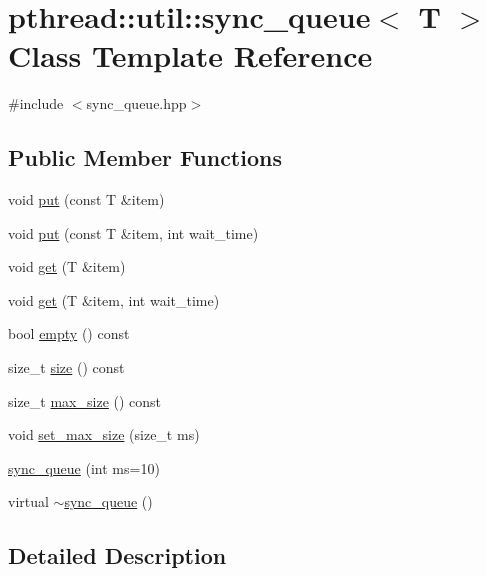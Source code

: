\hypertarget{classpthread_1_1util_1_1sync__queue}{\section{pthread\+:\+:util\+:\+:sync\+\_\+queue$<$ T $>$ Class Template Reference}
\label{classpthread_1_1util_1_1sync__queue}
}


{\ttfamily \#include $<$sync\+\_\+queue.\+hpp$>$}

\subsection*{Public Member Functions}
\begin{DoxyCompactItemize}
\item 
void \hyperlink{classpthread_1_1util_1_1sync__queue_a235265f27a6d2500ab2b56c83d703f06}{put} (const T \&item)
\item 
void \hyperlink{classpthread_1_1util_1_1sync__queue_aa507ddc9d8d86fa8d9510c3bc63a877b}{put} (const T \&item, int wait\+\_\+time)
\item 
void \hyperlink{classpthread_1_1util_1_1sync__queue_ac30ef4e626177ae47f27399ff3c8f28b}{get} (T \&item)
\item 
void \hyperlink{classpthread_1_1util_1_1sync__queue_ae5354915a1c76760924855318a11be04}{get} (T \&item, int wait\+\_\+time)
\item 
bool \hyperlink{classpthread_1_1util_1_1sync__queue_ad915d5b45a49f6f6bd09b5bdf170dd10}{empty} () const 
\item 
size\+\_\+t \hyperlink{classpthread_1_1util_1_1sync__queue_a99e07d02c268e4a7c6cab7ee5ee06274}{size} () const 
\item 
size\+\_\+t \hyperlink{classpthread_1_1util_1_1sync__queue_ae805476dd5db21e3b48b2d7ae7394305}{max\+\_\+size} () const 
\item 
void \hyperlink{classpthread_1_1util_1_1sync__queue_a5ac6e6e5d64171d63db00c60cb98f693}{set\+\_\+max\+\_\+size} (size\+\_\+t ms)
\item 
\hyperlink{classpthread_1_1util_1_1sync__queue_a2ca4ec947675b48411fda94770e80d3f}{sync\+\_\+queue} (int ms=10)
\item 
virtual \hyperlink{classpthread_1_1util_1_1sync__queue_ad2f95ba727c920fe9614f54377e32fe1}{$\sim$sync\+\_\+queue} ()
\end{DoxyCompactItemize}


\subsection{Detailed Description}
